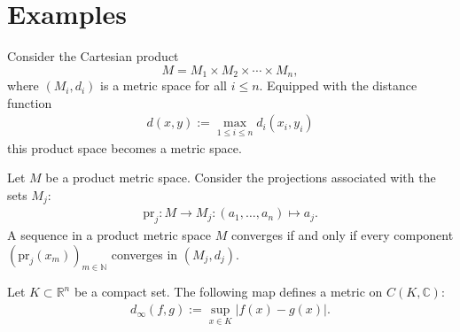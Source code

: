 
\section{Examples}

    \begin{example}
        Consider the Cartesian product \[M = M_1\times M_2\times\cdots\times M_n,\] where $(M_i,d_i)$ is a metric space for all $i\leq n$. Equipped with the distance function
        \begin{gather}
            d(x,y) := \max_{1\leq i\leq n}d_i(x_i,y_i)
        \end{gather}
        this product space becomes a metric space.
    \end{example}
    \begin{property}\label{metric:projection}
        Let $M$ be a product metric space. Consider the projections associated with the sets $M_j$:
        \begin{gather}
            \mathrm{pr}_j:M\rightarrow M_j:(a_1,\ldots,a_n)\mapsto a_j.
        \end{gather}
        A sequence in a product metric space $M$ converges if and only if every component $(\mathrm{pr}_j(x_m))_{m\in\mathbb{N}}$ converges in $(M_j, d_j)$.
    \end{property}

    \begin{example}\label{metric:supremum_distance}
        Let $K\subset\mathbb{R}^n$ be a compact set. The following map defines a metric on $C(K,\mathbb{C})$:
        \begin{gather}
            d_\infty(f,g) := \sup_{x\in K}|f(x) - g(x)|.
        \end{gather}
    \end{example}

